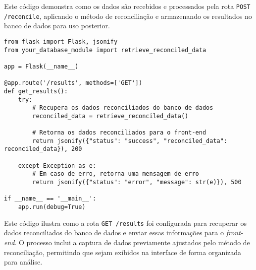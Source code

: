 Este código demonstra como os dados são recebidos e processados pela rota \texttt{POST /reconcile}, aplicando o método de reconciliação e armazenando os resultados no banco de dados para uso posterior.

\label{Anexo:CodigoRouteResults}

\begin{verbatim}
from flask import Flask, jsonify
from your_database_module import retrieve_reconciled_data

app = Flask(__name__)

@app.route('/results', methods=['GET'])
def get_results():
    try:
        # Recupera os dados reconciliados do banco de dados
        reconciled_data = retrieve_reconciled_data()

        # Retorna os dados reconciliados para o front-end
        return jsonify({"status": "success", "reconciled_data": reconciled_data}), 200

    except Exception as e:
        # Em caso de erro, retorna uma mensagem de erro
        return jsonify({"status": "error", "message": str(e)}), 500

if __name__ == '__main__':
    app.run(debug=True)
\end{verbatim}

Este código ilustra como a rota \texttt{GET /results} foi configurada para recuperar os dados reconciliados do banco de dados e enviar essas informações para o \textit{front-end}. O processo inclui a captura de dados previamente ajustados pelo método de reconciliação, permitindo que sejam exibidos na interface de forma organizada para análise.

\label{Anexo:CodigoRouteUpload}

